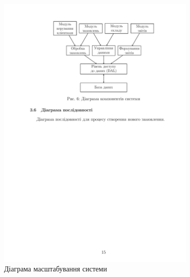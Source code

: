 \documentclass[14pt,a4paper]{extarticle}
\begin{document}
\begin{figure}[h!]
\centering
\includegraphics[width=0.85\textwidth]{diagrams/diagram-16.png}
\caption{Діаграма масштабування системи}
\end{figure}
\end{document}
